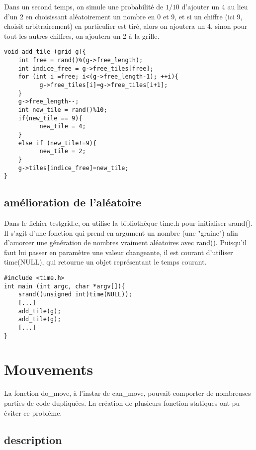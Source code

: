 \documentclass{report}
\begin{document}
Dans un second temps, on simule une probabilité de $1/10$ d'ajouter un 4 au lieu d'un 2 en choisissant aléatoirement un nombre en 0 et 9, et si un chiffre (ici 9, choisit arbitrairement) en particulier est tiré, alors on ajoutera un 4, sinon pour tout les autres chiffres, on ajoutera un 2 à la grille.


\begin{lstlisting}
void add_tile (grid g){
    int free = rand()%(g->free_length);
    int indice_free = g->free_tiles[free];
    for (int i =free; i<(g->free_length-1); ++i){
          g->free_tiles[i]=g->free_tiles[i+1];
    }
    g->free_length--;
    int new_tile = rand()%10;
    if(new_tile == 9){
          new_tile = 4;
    }
    else if (new_tile!=9){
          new_tile = 2;
    }
    g->tiles[indice_free]=new_tile;
}
\end{lstlisting}

\section{amélioration de l'aléatoire}

Dans le fichier testgrid.c, on utilise la bibliothèque time.h pour initialiser srand(). Il s'agit d'une fonction qui prend en argument un nombre (une "graine") afin d'amorcer une génération de nombres vraiment aléatoires avec rand(). Puisqu'il faut lui passer en paramètre une valeur changeante, il est courant d'utiliser time(NULL), qui retourne un objet représentant le temps courant.

\begin{lstlisting}
#include <time.h> 
int main (int argc, char *argv[]){
    srand((unsigned int)time(NULL));
    [...]
    add_tile(g);
    add_tile(g);
    [...]
}
\end{lstlisting}


\chapter{Mouvements}

La fonction do{\_}move, à l'instar de can{\_}move, pouvait comporter de nombreuses parties de code dupliquées. La création de plusieurs fonction statiques ont pu éviter ce problème.

\section{description}
\end{document}
